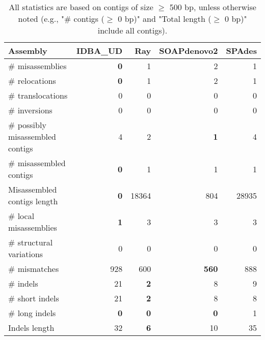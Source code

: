 \documentclass[12pt,a4paper]{article}
\begin{document}
\begin{table}[ht]
\begin{center}
\caption{All statistics are based on contigs of size $\geq$ 500 bp, unless otherwise noted (e.g., "\# contigs ($\geq$ 0 bp)" and "Total length ($\geq$ 0 bp)" include all contigs).}
\begin{tabular}{|l*{4}{|r}|}
\hline
Assembly & IDBA\_UD & Ray & SOAPdenovo2 & SPAdes \\ \hline
\# misassemblies & {\bf 0} & 1 & 2 & 1 \\ \hline
\hspace{5mm}\# relocations & {\bf 0} & 1 & 2 & 1 \\ \hline
\hspace{5mm}\# translocations & 0 & 0 & 0 & 0 \\ \hline
\hspace{5mm}\# inversions & 0 & 0 & 0 & 0 \\ \hline
\# possibly misassembled contigs & 4 & 2 & {\bf 1} & 4 \\ \hline
\# misassembled contigs & {\bf 0} & 1 & 1 & 1 \\ \hline
Misassembled contigs length & {\bf 0} & 18364 & 804 & 28935 \\ \hline
\# local misassemblies & {\bf 1} & 3 & 3 & 3 \\ \hline
\# structural variations & 0 & 0 & 0 & 0 \\ \hline
\# mismatches & 928 & 600 & {\bf 560} & 888 \\ \hline
\# indels & 21 & {\bf 2} & 8 & 9 \\ \hline
\hspace{5mm}\# short indels & 21 & {\bf 2} & 8 & 8 \\ \hline
\hspace{5mm}\# long indels & {\bf 0} & {\bf 0} & {\bf 0} & 1 \\ \hline
Indels length & 32 & {\bf 6} & 10 & 35 \\ \hline
\end{tabular}
\end{center}
\end{table}
\end{document}

